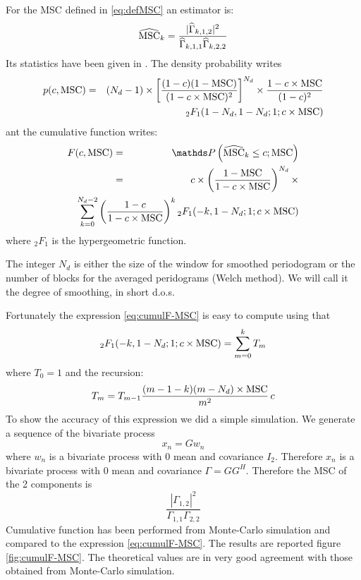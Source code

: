 For the MSC defined in \eqref{eq:defMSC} an estimator is:
\begin{eqnarray}
\label{eq:MSCestimate}
 \widehat{\mathrm{MSC}}_{k}= \frac{|\widehat\Gamma_{k,1,2}|^{2}}{\widehat\Gamma_{k,1,1}\widehat\Gamma_{k,2,2}}
\end{eqnarray}
Its statistics have been given in \cite{carter:1973}. The density probability writes
\begin{eqnarray}
\label{eq:pdf-MSC}
p(c,\mathrm{MSC})
 &=&\nonumber
 (N_{d}-1)\times \left[
 \frac{(1-c)(1-\mathrm{MSC})}{(1-c\times\mathrm{MSC})^{2}}
 \right]^{N_{d}}\times\frac{1-c\times\mathrm{MSC}}{(1-c)^{2}}
 \\
 &&{}_{2}F_{1}(1-N_{d},1-N_{d};1;c\times\mathrm{MSC})
\end{eqnarray}
ant the cumulative function writes:
\begin{eqnarray}
\label{eq:cumulF-MSC}
F(c,\MSC)
 &=& \nonumber
\prob{\hMSC_{k}\leq c;\MSC}
\\
 &=&\nonumber
 c \times \left(
 \frac{1-\MSC}{1-c\times\MSC}
 \right)^{N_{d}} \times
  \\
 &&\hspace{-2cm}
 \sum_{k=0}^{N_{d}-2}\left(\frac{1-c}{1-c\times\MSC}\right)^{k}
  {}_{2}F_{1}(-k,1-N_{d};1;c\times\MSC)
\end{eqnarray}
where ${}_{2}F_{1}$ is the hypergeometric function.

The integer $N_{d}$ is either the size of the window for smoothed periodogram or the number of blocks for the averaged peridograms (Welch method). We will call it the  degree of smoothing, in short d.o.s.

Fortunately the expression \eqref{eq:cumulF-MSC} is easy to compute using that
$$
 {}_{2}F_{1}(-k,1-N_{d};1;c\times\mathrm{MSC})=\sum_{m=0}^{k}T_{m}
$$ 
where $T_{0}=1$ and the recursion:
\begin{eqnarray}
\label{eq:Trecursion}
T_{m} = T_{m-1}\frac{(m-1-k)(m-N_{d})\times\mathrm{MSC}}{m^{2}}\,c
\end{eqnarray}
To show the accuracy of this expression we did a simple simulation. We generate a sequence of the bivariate process
$$
 x_{n} = Gw_{n}
$$
where $w_{n}$ is a bivariate process with 0 mean and covariance $I_{2}$. Therefore $x_{n}$ is a bivariate process with 0 mean  and covariance $\Gamma=GG^{H}$. Therefore the MSC of the 2 components is
$$
 \frac{|\Gamma_{1,2}|^{2}}{\Gamma_{1,1}\Gamma_{2,2}}
$$
Cumulative function has been performed from Monte-Carlo simulation and compared to the expression
\eqref{eq:cumulF-MSC}. The results are reported figure \ref{fig:cumulF-MSC}. The theoretical values are in very good agreement with those obtained from Monte-Carlo simulation. 

